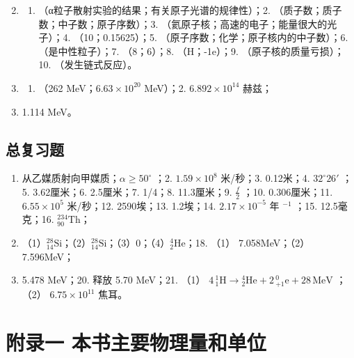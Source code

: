 \begin{enumerate}[label=\Roman*.]
\setcounter{enumi}{1}
\item
  \begin{enumerate}
  \item
    （α粒子散射实验的结果；有关原子光谱的规律性）；2.
    （质子数；质子数；中子数；原子序数）；3.
    （氦原子核；高速的电子；能量很大的光子）；4. （10；0.15625）；5.
    （原子序数；化学；原子核内的中子数）；6. （是中性粒子）；7.
    （8；6）；8. （H；-1e）；9. （原子核的质量亏损）；10.
    （发生链式反应）。
  \end{enumerate}
\item
  \begin{enumerate}
  \item
    （262 MeV；\(6.63 \times 10^{20}\) MeV）；2. \(6.892\times10^{14}\)
    赫兹；
  \end{enumerate}
\end{enumerate}

\begin{enumerate}
\setcounter{enumi}{2}
\item
  1.114 MeV。
\end{enumerate}

\section{总复习题}

\begin{enumerate}
\item
  从乙媒质射向甲媒质；\(\alpha\geqslant50^{\circ}\) ；2.
  \(1.59\times10^{8}\) 米/秒；3. 0.12米；4. \(32^{\circ}26'\) ；5.
  3.62厘米；6. 2.5厘米；7. 1/4；8. 11.3厘米；9. \(\frac{f}{2}\) ；10.
  0.306厘米；11. \(6.55\times10^{5}\) 米/秒；12. 2590埃；13. 1.2埃；14.
  \(2.17\times10^{-5}\) 年 \(^{-1}\) ；15. 12.5毫克；16.
  \({}^{234}_{90}\mathrm{Th}\)；
\item
  （1）\({}^{28}_{14}\mathrm{Si}\)；（2）\({}^{28}_{14}\mathrm{Si}\)；（3）0；（4）\({}^{4}_{2}\mathrm{He}\)；18.
  （1） 7.058MeV；（2） 7.596MeV；
\item
  5.478 MeV；20. 释放 5.70 MeV；21. （1）
  \(4\,{}^{1}_{1}\mathrm{H}\longrightarrow{}^{4}_{2}\mathrm{He}+2\,{}^{0}_{+1}\mathrm{e}+28\,\mathrm{MeV}\)
  ；（2） \(6.75 \times 10^{11}\) 焦耳。
\end{enumerate}

\chapter{附录一
本书主要物理量和单位}

